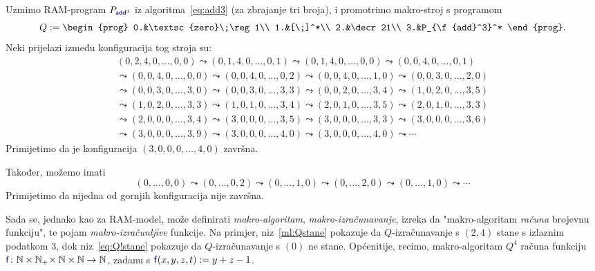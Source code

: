 \begin{primjer}\label{pr:makro}
Uzmimo RAM-program $P_{\f{add}^3}$ iz algoritma~\eqref{eq:add3} (za zbrajanje tri broja), i promotrimo makro-stroj s programom
\begin{equation}
    Q:=\begin{prog}
        0.&\textsc{zero}\;\reg1\\
        1.&[\;]^*\\
        2.&\decr21\\
        3.&P_{\f{add}^3}^*
    \end{prog}\text.
\end{equation}
Neki prijelazi između konfiguracija tog stroja su:
\begin{multline}\label{ml:Qstane}
    (0,2,4,0,\dotsc,0,0)\leadsto
    (0,1,4,0,\dotsc,0,1)\leadsto
    (0,1,4,0,\dotsc,0,0)\leadsto
    (0,0,4,0,\dotsc,0,1)\\\leadsto
    (0,0,4,0,\dotsc,0,0)\leadsto
    (0,0,4,0,\dotsc,0,2)\leadsto
    (0,0,4,0,\dotsc,1,0)\leadsto
    (0,0,3,0,\dotsc,2,0)\\\leadsto
    (0,0,3,0,\dotsc,3,0)\leadsto
    (0,0,3,0,\dotsc,3,3)\leadsto
    (0,0,2,0,\dotsc,3,4)\leadsto
    (1,0,2,0,\dotsc,3,5)\\\leadsto
    (1,0,2,0,\dotsc,3,3)\leadsto
    (1,0,1,0,\dotsc,3,4)\leadsto
    (2,0,1,0,\dotsc,3,5)\leadsto
    (2,0,1,0,\dotsc,3,3)\\\leadsto
    (2,0,0,0,\dotsc,3,4)\leadsto
    (3,0,0,0,\dotsc,3,5)\leadsto
    (3,0,0,0,\dotsc,3,3)\leadsto
    (3,0,0,0,\dotsc,3,6)\\\leadsto
    (3,0,0,0,\dotsc,3,9)\leadsto
    (3,0,0,0,\dotsc,4,0)\leadsto(3,0,0,0,\dotsc,4,0)\leadsto\dotsb
\end{multline}
Primijetimo da je konfiguracija $(3,0,0,0,\dotsc,4,0)$ završna.

Također, možemo imati
\begin{equation}\label{eq:Q!stane}
    (0,\dotsc,0,0)\leadsto
    (0,\dotsc,0,2)\leadsto
    (0,\dotsc,1,0)\leadsto
    (0,\dotsc,2,0)\leadsto
    (0,\dotsc,1,0)\leadsto\dotsb
\end{equation}
Primijetimo da nijedna od gornjih konfiguracija nije završna.
\end{primjer}

Sada se, jednako kao za RAM-model, može definirati \emph{makro-algoritam}, \emph{makro-izračunavanje}, izreka da "makro-algoritam \emph{računa} brojevnu funkciju", te pojam  \emph{makro-izračunljive} funkcije. Na primjer, niz~\eqref{ml:Qstane} pokazuje da $Q$-izračunavanje s $(2,4)$ stane s izlaznim podatkom $3$, dok niz~\eqref{eq:Q!stane} pokazuje da $Q$-izračunavanje s $(0)$ ne stane. Općenitije, recimo, makro-algoritam $Q^4$ računa funkciju $\f{f}\colon\N\times\N_+\!\times\N\times\N\to\N$, zadanu s $\f{f}(x,y,z,t):=y+z-1$.

